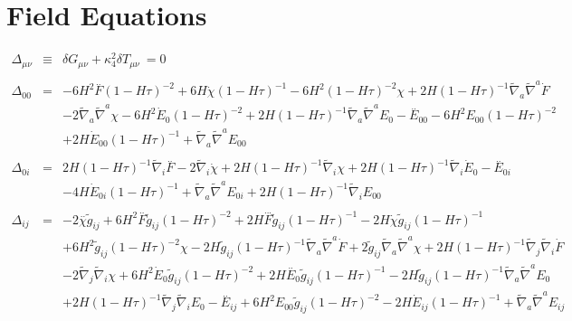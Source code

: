 \documentclass[10pt,letterpaper]{article}
\numberwithin{equation}{section}
\begin{document}
\section{Field Equations}
\begin{eqnarray}
\Delta_{\mu\nu} &\equiv& \delta G_{\mu\nu} +\kappa^2_4\delta T_{\mu\nu}\ =0
\\ \nonumber\\
\Delta_{00}&=& -6 H^2 \overset{..}{F} (1 -  H \tau)^{-2} + 6 H \dot{\chi} (1 -  H \tau)^{-1} - 6 H^2 (1 -  H \tau)^{-2} \chi + 2 H (1 -  H \tau)^{-1} \tilde{\nabla}_{a}\tilde{\nabla}^{a}\dot{F} \nonumber \\ 
&& - 2 \tilde{\nabla}_{a}\tilde{\nabla}^{a}\chi -6 H^2 \dot{E}_{0}{} (1 -  H \tau)^{-2} + 2 H (1 -  H \tau)^{-1} \tilde{\nabla}_{a}\tilde{\nabla}^{a}E_{0}{}- \overset{..}{E}_{00}{} - 6 H^2 E_{00}{} (1 -  H \tau)^{-2} \nonumber \\ 
&& + 2 H \dot{E}_{00}{} (1 -  H \tau)^{-1} + \tilde{\nabla}_{a}\tilde{\nabla}^{a}E_{00}{}
\\  \nonumber\\ 
\Delta_{0i}&=& 2 H (1 -  H \tau)^{-1} \tilde{\nabla}_{i}\overset{..}{F} - 2 \tilde{\nabla}_{i}\dot{\chi} + 2 H (1 -  H \tau)^{-1} \tilde{\nabla}_{i}\chi +2 H (1 -  H \tau)^{-1} \tilde{\nabla}_{i}\dot{E}_{0}{}- \overset{..}{E}_{0i}{} \nonumber \\ 
&& - 4 H \dot{E}_{0i}{} (1 -  H \tau)^{-1} + \tilde{\nabla}_{a}\tilde{\nabla}^{a}E_{0i}{} + 2 H (1 -  H \tau)^{-1} \tilde{\nabla}_{i}E_{00}{}
\\  \nonumber\\ 
\Delta_{ij}&=& -2 \overset{..}{\chi} \tilde{g}_{ij} + 6 H^2 \overset{..}{F} \tilde{g}_{ij} (1 -  H \tau)^{-2} + 2 H \overset{...}{F} \tilde{g}_{ij} (1 -  H \tau)^{-1} - 2 H \dot{\chi} \tilde{g}_{ij} (1 -  H \tau)^{-1} \nonumber \\ 
&& + 6 H^2 \tilde{g}_{ij} (1 -  H \tau)^{-2} \chi - 2 H \tilde{g}_{ij} (1 -  H \tau)^{-1} \tilde{\nabla}_{a}\tilde{\nabla}^{a}\dot{F} + 2 \tilde{g}_{ij} \tilde{\nabla}_{a}\tilde{\nabla}^{a}\chi + 2 H (1 -  H \tau)^{-1} \tilde{\nabla}_{j}\tilde{\nabla}_{i}\dot{F} \nonumber \\ 
&& - 2 \tilde{\nabla}_{j}\tilde{\nabla}_{i}\chi +6 H^2 \dot{E}_{0}{} \tilde{g}_{ij} (1 -  H \tau)^{-2} + 2 H \overset{..}{E}_{0}{} \tilde{g}_{ij} (1 -  H \tau)^{-1} - 2 H \tilde{g}_{ij} (1 -  H \tau)^{-1} \tilde{\nabla}_{a}\tilde{\nabla}^{a}E_{0}{} \nonumber \\ 
&& + 2 H (1 -  H \tau)^{-1} \tilde{\nabla}_{j}\tilde{\nabla}_{i}E_{0}{}- \overset{..}{E}_{ij} + 6 H^2 E_{00}{} \tilde{g}_{ij} (1 -  H \tau)^{-2} - 2 H \dot{E}_{ij} (1 -  H \tau)^{-1} + \tilde{\nabla}_{a}\tilde{\nabla}^{a}E_{ij} \nonumber \\ 

\end{eqnarray}
\end{document}
